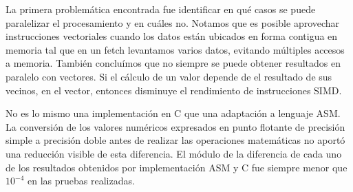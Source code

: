 
\par La primera problemática encontrada fue identificar en qué casos se puede paralelizar el procesamiento y en cuáles no. Notamos que es posible aprovechar instrucciones vectoriales cuando los datos están ubicados en forma contigua en memoria tal que en un fetch levantamos varios datos, evitando múltiples accesos a memoria. También concluímos que no siempre se puede obtener resultados en paralelo con vectores. Si el cálculo de un valor depende de el resultado de sus vecinos, en el vector, entonces disminuye el rendimiento de instrucciones SIMD.

No es lo mismo una implementación en C que una adaptación a lenguaje ASM. La conversión de los valores numéricos expresados en punto flotante de precisión simple a precisión doble antes de realizar las operaciones matemáticas no aportó una reducción visible de esta diferencia. El módulo de la diferencia de cada uno de los resultados obtenidos por implementación ASM y C fue siempre menor que $10^{-4}$ en las pruebas realizadas.%


